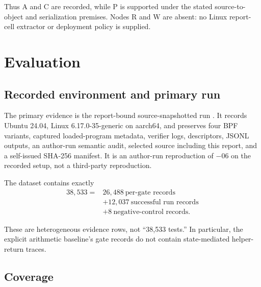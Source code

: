 \documentclass[conference]{IEEEtran}
\begin{document}
Thus A and C are recorded, while P is supported under the stated source-to-object and serialization premises. Nodes R and W are absent: no Linux report-cell extractor or deployment policy is supplied.

\section{Evaluation}

\subsection{Recorded environment and primary run}

The primary evidence is the report-bound source-snapshotted run . It records Ubuntu 24.04, Linux 6.17.0-35-generic on aarch64, and preserves four BPF variants, captured loaded-program metadata, verifier logs, descriptors, JSONL outputs, an author-run semantic audit, selected source including this report, and a self-issued SHA-256 manifest. It is an author-run reproduction of $-06$ on the recorded setup, not a third-party reproduction.

The dataset contains exactly
\begin{equation}
\begin{split}
38{,}533={}&26{,}488\ \text{per-gate records}\\
&+12{,}037\ \text{successful run records}\\
&+8\ \text{negative-control records}.
\end{split}
\end{equation}

These are heterogeneous evidence rows, not ``38,533 tests.'' In particular, the explicit arithmetic baseline's gate records do not contain state-mediated helper-return traces.

\subsection{Coverage}
\end{document}

